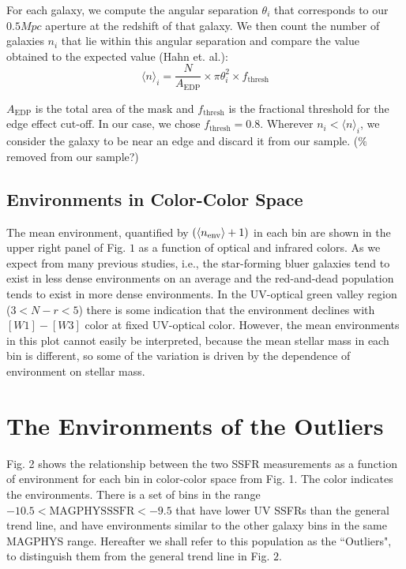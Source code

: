 \documentclass[iop]{emulateapj}
\begin{document}
For each galaxy, we compute the angular separation 
$\theta_{i}$ that corresponds to our $0.5 Mpc$ aperture at 
the redshift of that galaxy. We then count the number of 
galaxies $n_{i}$ that lie within this angular separation 
and compare the value obtained to the expected value 
(Hahn et. al.): $$\big \langle n \big \rangle _{i} = 
\frac{N}{A_{\mathrm{EDP}}} \times \pi \theta_{i}^{2} 
\times f_{\mathrm{thresh}} $$

$A_{\mathrm{EDP}}$ is the total area of the mask and 
$f_{\mathrm{thresh}}$ is the fractional threshold for the 
edge effect cut-off. In our case, we chose $f_{\mathrm{thresh}} = 0.8$. 
Wherever $n_{i} < \big \langle n \big \rangle _{i} $, 
we consider the galaxy to be near an edge and discard it 
from our sample. ($\%$ removed from our sample?)

\subsection{Environments in Color-Color Space}

The mean environment, quantified by $(\langle n_{\rm env}\rangle + 1)$
in each bin are shown in the upper right panel of Fig. $1$ as a function 
of optical and infrared colors. As we expect from many previous studies, 
i.e., the star-forming bluer galaxies tend to exist in less dense 
environments on an average and the red-and-dead population tends 
to exist in more dense environments. In the UV-optical green valley region
($3 < N-r < 5$) there is some indication that the environment declines 
with $[W1]-[W3]$ color at fixed UV-optical color. However, the 
mean environments in this plot cannot easily be interpreted, because
the mean stellar mass in each bin is different, so some of the variation
is driven by the dependence of environment on stellar mass.

\section{The Environments of the Outliers}

Fig. 2 shows the relationship between the two SSFR 
measurements as a function of environment
for each bin in color-color space from Fig. 1. The color
indicates the environments. 
There is a set of bins in the range 
$ -10.5 < \mathrm{MAGPHYS} \mathrm{SSFR} < -9.5$ that 
have lower UV SSFRs than the general trend line, and 
have environments similar to the other galaxy bins 
in the same MAGPHYS range. Hereafter we shall refer 
to this population as the ``Outliers", to distinguish 
them from the general trend line in Fig. $2$. 
\end{document}
